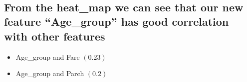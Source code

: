 \documentclass[11pt]{article}
\begin{document}
    \begin{center}
    \end{center}
    { \hspace*{\fill} \\}
    
    \hypertarget{from-the-heat_map-we-can-see-that-our-new-feature-age_group-has-good-correlation-with-other-features}{%
\subsection{From the heat\_map we can see that our new feature
``Age\_group'' has good correlation with other
features}\label{from-the-heat_map-we-can-see-that-our-new-feature-age_group-has-good-correlation-with-other-features}}

\begin{itemize}
\item
  Age\_group and Fare \((0.23)\)
\item
  Age\_group and Parch \((0.2)\)
\end{itemize}
\end{document}
